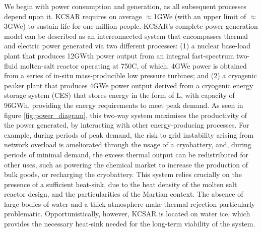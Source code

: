 \documentclass[fleqn,10pt]{Stylesheet} %
\begin{document}
We begin with power consumption and generation, as all subsequent processes depend upon it. KCSAR requires on average $\approx$1GWe (with an upper limit of $\approx$3GWe) to sustain life for one million people. KCSAR’s complete power generation model can be described as an interconnected system that encompasses thermal and electric power generated via two different processes: (1) a nuclear base-load plant that produces 12GWth power output from an integral fast-spectrum two-fluid molten-salt reactor operating at 750\degree{}C, of which, 4GWe power is obtained from a series of in-situ mass-producible low pressure turbines; and (2) a cryogenic peaker plant that produces 4GWe power output derived from a cryogenic energy storage system (CES) that stores energy in the form of L, with capacity of 96GWh, providing the energy requirements to meet peak demand. As seen in figure \ref{fig:power_diagram}, this two-way system maximises the productivity of the power generated, by interacting with other energy-producing processes. For example, during periods of peak demand, the risk to grid instability arising from network overload is ameliorated through the usage of a cryobattery, and, during periods of minimal demand, the excess thermal output can be redistributed for other uses, such as powering the chemical market to increase the production of bulk goods, or recharging the cryobattery. This system relies crucially on the presence of a sufficient heat-sink, due to the heat density of the molten salt reactor design, and the particularities of the Martian context. The absence of large bodies of water and a thick atmosphere make thermal rejection particularly problematic. Opportunistically, however, KCSAR is located on water ice, which provides the necessary heat-sink needed for the long-term viability of the system.
\end{document}
